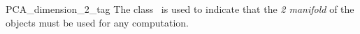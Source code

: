 
\begin{ccRefClass}{PCA_dimension_2_tag}  
\ccDefinition
The class \ccRefName\ is used to indicate that the \textit{2 manifold} of the objects must be used for any computation.



\end{ccRefClass}

